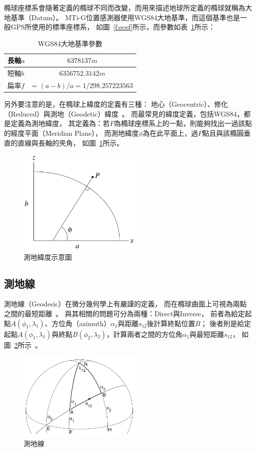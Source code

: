 橢球座標系會隨著定義的橢球不同而改變，而用來描述地球所定義的橢球就稱為大地基準（Datum）。
MTi-G位置感測器使用WGS84大地基準，而這個基準也是一般GPS所使用的標準座標系，
如圖~\ref{f:ecef}所示，而參數如表~\ref{t:wgs84}所示：
\begin{table}[h!]
	\centering
	\caption{WGS84大地基準參數}
	\label{t:wgs84}
	\begin{tabular}{ | l | c | }
		\hline
		長軸$a$ & $6378137m$ \\ \hline
		短軸$b$ & $6356752.3142m$ \\ \hline
		扁率$f$	& = $(a-b) / a = 1/298.257223563$ \\
		\hline
	\end{tabular}
\end{table}

另外要注意的是，在橢球上緯度的定義有三種：
地心（Geocentric）、修化（Reduced）與測地（Geodetic）緯度~\cite{Jekeli:2006:GRSinGeodesy}。
而最常見的緯度定義，包括WGS84，都是定義為測地緯度，
其定義為：若$P$為橢球座標系上的一點，則能夠找出一過該點的經度平面（Meridian Plane），
而測地緯度$\phi$為在此平面上，過$P$點且與該橢圓垂直的直線與長軸的夾角，
如圖~\ref{f:geodetic_latitude}所示。
\begin{figure}[h!]
	\centering
	\includegraphics[width=6cm]{figures/algorithm/geodetic_latitude}
	\caption{測地緯度示意圖}
	\label{f:geodetic_latitude}
\end{figure}

\subsection{測地線}
測地線（Geodesic）在微分幾何學上有嚴謹的定義，
而在橢球曲面上可視為兩點之間的最短距離~\cite{Karney:2013:Algorithms_for_Geodesics}。
與其相關的問題可分為兩種：Direct與Inverse，
前者為給定起點$A(\phi_1,\lambda_1)$、方位角（azimuth）$\alpha_1$與距離$s_{12}$後計算終點位置$B$；
後者則是給定起點$A(\phi_1,\lambda_1)$與終點$B(\phi_2,\lambda_2)$，計算兩者之間的方位角$\alpha_1$與最短距離$s_{12}$，
如圖~\ref{f:geodesic}所示~\cite{Jekeli:2006:GRSinGeodesy}。
\begin{figure}[h!]
	\centering
	\includegraphics[width=6cm]{figures/algorithm/geodesic}
	\caption{測地線}
	\label{f:geodesic}
\end{figure}

